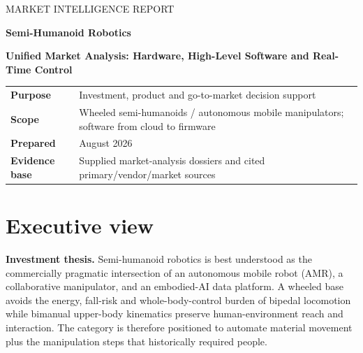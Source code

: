\documentclass[11pt,a4paper]{article}
\begin{document}
\begin{titlepage}
\color{navy}
\vspace*{1.4cm}
{\Large MARKET INTELLIGENCE REPORT\par}
\vspace{0.4cm}
{\huge\bfseries Semi-Humanoid Robotics\par}
\vspace{0.15cm}
{\Large\bfseries Unified Market Analysis: Hardware, High-Level Software and Real-Time Control\par}
\vspace{1.1cm}
\vfill
\begin{tabular}{@{}ll@{}}
\textbf{Purpose} & Investment, product and go-to-market decision support \\
\textbf{Scope} & Wheeled semi-humanoids / autonomous mobile manipulators; software from cloud to firmware \\
\textbf{Prepared} & August 2026 \\
\textbf{Evidence base} & Supplied market-analysis dossiers and cited primary/vendor/market sources \\
\end{tabular}
\vspace{1.2cm}
\end{titlepage}

\tableofcontents
\newpage

\section{Executive view}

\textbf{Investment thesis.} Semi-humanoid robotics is best understood as the commercially pragmatic intersection of an autonomous mobile robot (AMR), a collaborative manipulator, and an embodied-AI data platform. A wheeled base avoids the energy, fall-risk and whole-body-control burden of bipedal locomotion while bimanual upper-body kinematics preserve human-environment reach and interaction. The category is therefore positioned to automate material movement plus the manipulation steps that historically required people.
\end{document}
